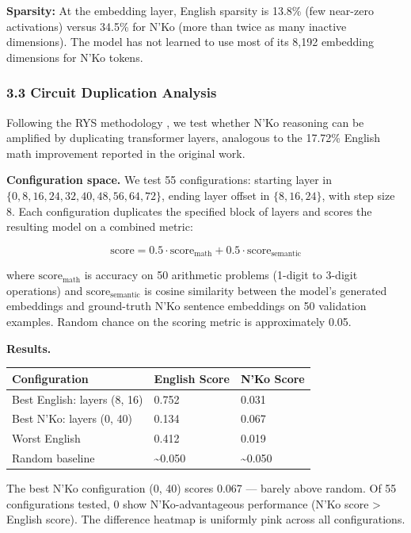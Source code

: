 \documentclass[
]{article}
\newcounter{none} %
\begin{document}
\textbf{Sparsity:} At the embedding layer, English sparsity is 13.8\%
(few near-zero activations) versus 34.5\% for N'Ko (more than twice as
many inactive dimensions). The model has not learned to use most of its
8,192 embedding dimensions for N'Ko tokens.

\subsubsection{3.3 Circuit Duplication
Analysis}\label{circuit-duplication-analysis}

Following the RYS methodology \cite{ng2024rys}, we test whether N'Ko
reasoning can be amplified by duplicating transformer layers, analogous
to the 17.72\% English math improvement reported in the original work.

\textbf{Configuration space.} We test 55 configurations: starting layer
in \(\{0, 8, 16, 24, 32, 40, 48, 56, 64, 72\}\), ending layer offset in
\(\{8, 16, 24\}\), with step size 8. Each configuration duplicates the
specified block of layers and scores the resulting model on a combined
metric:

\[\text{score} = 0.5 \cdot \text{score}_\text{math} + 0.5 \cdot \text{score}_\text{semantic}\]

where \(\text{score}_\text{math}\) is accuracy on 50 arithmetic problems
(1-digit to 3-digit operations) and \(\text{score}_\text{semantic}\) is
cosine similarity between the model's generated embeddings and
ground-truth N'Ko sentence embeddings on 50 validation examples. Random
chance on the scoring metric is approximately 0.05.

\textbf{Results.}

{\def\LTcaptype{none} %
\begin{longtable}[]{@{}lll@{}}
\toprule\noalign{}
Configuration & English Score & N'Ko Score \\
\midrule\noalign{}
\endhead
\bottomrule\noalign{}
\endlastfoot
Best English: layers (8, 16) & 0.752 & 0.031 \\
Best N'Ko: layers (0, 40) & 0.134 & 0.067 \\
Worst English & 0.412 & 0.019 \\
Random baseline & \textasciitilde0.050 & \textasciitilde0.050 \\
\end{longtable}
}

The best N'Ko configuration (0, 40) scores 0.067 --- barely above
random. Of 55 configurations tested, 0 show N'Ko-advantageous
performance (N'Ko score \textgreater{} English score). The difference
heatmap is uniformly pink across all configurations.
\end{document}
